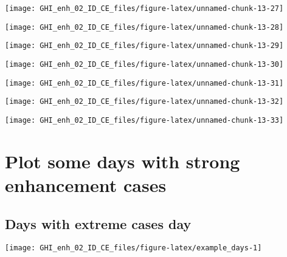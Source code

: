 \documentclass[
  10pt,
  a4paper,oneside]{article}
\begin{document}
\begin{center}\texttt{[image: GHI\_enh\_02\_ID\_CE\_files/figure-latex/unnamed-chunk-13-27]} \end{center}

\begin{center}\texttt{[image: GHI\_enh\_02\_ID\_CE\_files/figure-latex/unnamed-chunk-13-28]} \end{center}

\begin{center}\texttt{[image: GHI\_enh\_02\_ID\_CE\_files/figure-latex/unnamed-chunk-13-29]} \end{center}

\begin{center}\texttt{[image: GHI\_enh\_02\_ID\_CE\_files/figure-latex/unnamed-chunk-13-30]} \end{center}

\begin{center}\texttt{[image: GHI\_enh\_02\_ID\_CE\_files/figure-latex/unnamed-chunk-13-31]} \end{center}

\begin{center}\texttt{[image: GHI\_enh\_02\_ID\_CE\_files/figure-latex/unnamed-chunk-13-32]} \end{center}

\begin{center}\texttt{[image: GHI\_enh\_02\_ID\_CE\_files/figure-latex/unnamed-chunk-13-33]} \end{center}

\FloatBarrier

\hypertarget{plot-some-days-with-strong-enhancement-cases}{%
\section{Plot some days with strong enhancement cases}\label{plot-some-days-with-strong-enhancement-cases}}

\FloatBarrier

\hypertarget{days-with-extreme-cases-day}{%
\subsection{Days with extreme cases day}\label{days-with-extreme-cases-day}}

\begin{center}\texttt{[image: GHI\_enh\_02\_ID\_CE\_files/figure-latex/example\_days-1]} \end{center}
\end{document}
